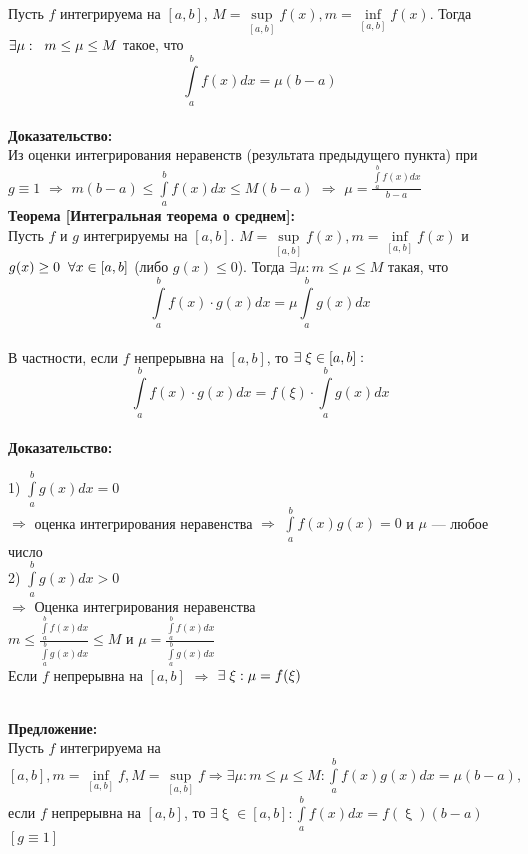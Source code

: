 \documentclass[a4paper,12pt]{article} %
\begin{document}
Пусть $ f $ интегрируема на $ [a, b] $, $ M = \sup\limits_{[a, b]} f(x), m = \inf\limits_{[a, b]} f(x) $. Тогда $ \exists \mu: \hspace{2 mm} m \leq \mu \leq M $ такое, что \\
$$ \int\limits_a^b f(x)dx = \mu (b - a)$$ \\
\textbf{Доказательство:} \\ [2 mm]
Из оценки интегрирования неравенств (результата предыдущего пункта) при $ g \equiv 1 $ $\Rightarrow$ $ m (b - a) \leq \int\limits_a^b f (x)dx \leq M(b - a) $ $ \Rightarrow $ $\displaystyle \mu = \frac {\int\limits_a^b f(x)dx}{b -a }$ \\ [2 mm]
\textbf{Теорема [Интегральная теорема о среднем]:} \\ [2mm]
Пусть $ f $ и $ g $ интегрируемы на $ [a, b] $. $ M = \sup\limits_{[a,b]} f(x), m = \inf\limits_{[a,b]} f(x) $ и \\ [2 mm] $ g(x) \geq 0 \hspace{2mm} \forall x \in [a, b] $ (либо  $g (x) \leq 0 $). Тогда $\exists \mu: m \leq \mu \leq M $ такая, что \\
$$ \int\limits_a^b f(x) \cdot g(x)dx = \mu \int\limits_a^b g(x)dx$$ \\
В частности, если $ f $ непрерывна на $ [a, b] $, то $\exists \hspace{1 mm} \xi \in [a,b]: $ \\ 
$$ \int\limits_a^b f(x) \cdot g(x)dx = f(\xi) \cdot \int\limits_a^b g(x)dx$$ \\ [6 mm]
\textbf{Доказательство:} \\ [2mm]
\begin{enumerate}
     1) $\int\limits_a^b g(x)dx = 0 $ \\
     $\Rightarrow$ оценка интегрирования неравенства $\Rightarrow$ $\int\limits_a^b f(x)g(x) = 0 $ и $\mu $ --- любое число\\  
     
     
     2) $\int\limits_a^b g(x)dx > 0 $ \\
     $\Rightarrow$ Оценка интегрирования неравенства \\ [2mm]
     $\displaystyle m \leq \frac{\int\limits_a^b f(x)dx}{\int\limits_a^b g(x)dx} \leq M$ и $\displaystyle \mu = \frac{\int\limits_a^b f(x)dx}{\int\limits_a^b g(x)dx} $ \\
     Если $ f $ непрерывна на $ [a,b] $ $\Rightarrow$ $\exists \hspace{1 mm} \xi: \mu = f(\xi) $
     \end{enumerate} \\ [2 mm]
     \textbf{Предложение:}\\[2mm]
     Пусть $f$ интегрируема на $[a,b], m = \inf\limits_{[a,b]}f, M = \sup \limits_{[a,b]}f \Rightarrow \exists \mu : m\leq \mu \leq M: \int \limits_a^b f(x)g(x)dx = \mu(b-a),$ если $f$ непрерывна на $[a,b]$, то $\exists \upxi \in [a,b]: \int \limits_a^b f(x)dx = f(\upxi)(b-a)$  $[g\equiv 1]$
\end{document}
